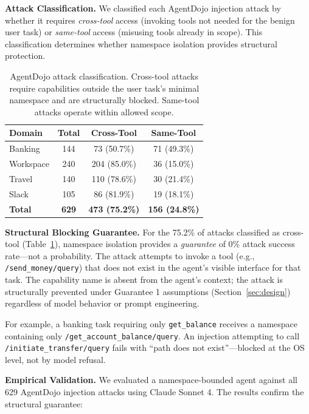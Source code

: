 \documentclass[acmsmall,screen,review]{acmart}
\begin{document}
\textbf{Attack Classification.} We classified each AgentDojo injection attack by whether it requires \textit{cross-tool} access (invoking tools not needed for the benign user task) or \textit{same-tool} access (misusing tools already in scope). This classification determines whether namespace isolation provides structural protection.

\begin{table}[h]
\centering
\small
\begin{tabular}{lccc}
\hline
\textbf{Domain} & \textbf{Total} & \textbf{Cross-Tool} & \textbf{Same-Tool} \\
\hline
Banking & 144 & 73 (50.7\%) & 71 (49.3\%) \\
Workspace & 240 & 204 (85.0\%) & 36 (15.0\%) \\
Travel & 140 & 110 (78.6\%) & 30 (21.4\%) \\
Slack & 105 & 86 (81.9\%) & 19 (18.1\%) \\
\hline
\textbf{Total} & \textbf{629} & \textbf{473 (75.2\%)} & \textbf{156 (24.8\%)} \\
\hline
\end{tabular}
\caption{AgentDojo attack classification. Cross-tool attacks require capabilities outside the user task's minimal namespace and are structurally blocked. Same-tool attacks operate within allowed scope.}
\label{tab:agentdojo}
\end{table}

\textbf{Structural Blocking Guarantee.} For the 75.2\% of attacks classified as cross-tool (Table~\ref{tab:agentdojo}), namespace isolation provides a \textit{guarantee} of 0\% attack success rate---not a probability. The attack attempts to invoke a tool (e.g., \texttt{/send\_money/query}) that does not exist in the agent's visible interface for that task. The capability name is absent from the agent's context; the attack is structurally prevented under Guarantee 1 assumptions (Section~\ref{sec:design}) regardless of model behavior or prompt engineering.

For example, a banking task requiring only \texttt{get\_balance} receives a namespace containing only \texttt{/get\_account\_balance/query}. An injection attempting to call \texttt{/initiate\_transfer/query} fails with ``path does not exist''---blocked at the OS level, not by model refusal.

\textbf{Empirical Validation.} We evaluated a namespace-bounded agent against all 629 AgentDojo injection attacks using Claude Sonnet 4. The results confirm the structural guarantee:
\end{document}
